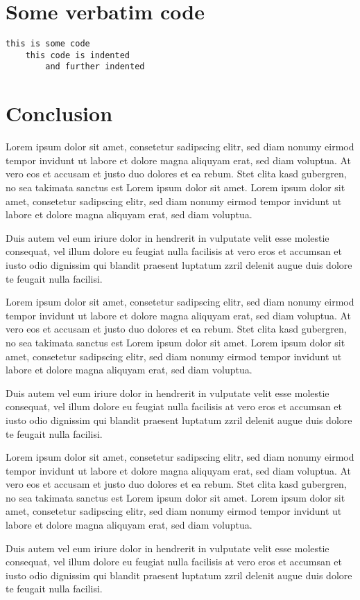 \section{Some verbatim code}

\begin{verbatim}
this is some code
    this code is indented
        and further indented
\end{verbatim}
\section{Conclusion}
\nobreak
Lorem ipsum dolor sit amet, consetetur sadipscing elitr, sed diam nonumy eirmod tempor invidunt ut labore et dolore magna aliquyam erat, sed diam voluptua. At vero eos et accusam et justo duo dolores et ea rebum. Stet clita kasd gubergren, no sea takimata sanctus est Lorem ipsum dolor sit amet. Lorem ipsum dolor sit amet, consetetur sadipscing elitr, sed diam nonumy eirmod tempor invidunt ut labore et dolore magna aliquyam erat, sed diam voluptua.

Duis autem vel eum iriure dolor in hendrerit in vulputate velit esse molestie consequat, vel illum dolore eu feugiat nulla facilisis at vero eros et accumsan et iusto odio dignissim qui blandit praesent luptatum zzril delenit augue duis dolore te feugait nulla facilisi.

Lorem ipsum dolor sit amet, consetetur sadipscing elitr, sed diam nonumy eirmod tempor invidunt ut labore et dolore magna aliquyam erat, sed diam voluptua. At vero eos et accusam et justo duo dolores et ea rebum. Stet clita kasd gubergren, no sea takimata sanctus est Lorem ipsum dolor sit amet. Lorem ipsum dolor sit amet, consetetur sadipscing elitr, sed diam nonumy eirmod tempor invidunt ut labore et dolore magna aliquyam erat, sed diam voluptua.

Duis autem vel eum iriure dolor in hendrerit in vulputate velit esse molestie consequat, vel illum dolore eu feugiat nulla facilisis at vero eros et accumsan et iusto odio dignissim qui blandit praesent luptatum zzril delenit augue duis dolore te feugait nulla facilisi.

Lorem ipsum dolor sit amet, consetetur sadipscing elitr, sed diam nonumy eirmod tempor invidunt ut labore et dolore magna aliquyam erat, sed diam voluptua. At vero eos et accusam et justo duo dolores et ea rebum. Stet clita kasd gubergren, no sea takimata sanctus est Lorem ipsum dolor sit amet. Lorem ipsum dolor sit amet, consetetur sadipscing elitr, sed diam nonumy eirmod tempor invidunt ut labore et dolore magna aliquyam erat, sed diam voluptua.

Duis autem vel eum iriure dolor in hendrerit in vulputate velit esse molestie consequat, vel illum dolore eu feugiat nulla facilisis at vero eros et accumsan et iusto odio dignissim qui blandit praesent luptatum zzril delenit augue duis dolore te feugait nulla facilisi.